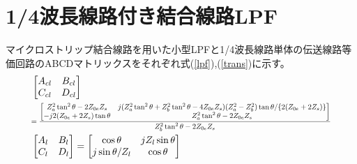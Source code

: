 \documentclass[12pt, fleqn]{jsarticle}
\begin{document}
\section{1/4波長線路付き結合線路LPF}
マイクロストリップ結合線路を用いた小型LPFと1/4波長線路単体の伝送線路等価回路のABCDマトリックスをそれぞれ式(\ref{lpf}),(\ref{trans})に示す。
\begin{align}
  \label{lpf}
  &\begin{bmatrix}
    A_{cl} & B_{cl} \\
    C_{cl} & D_{cl}
  \end{bmatrix} \notag \\
  &\scalebox{0.75}{$
  = \dfrac{
    \begin{bmatrix}
      Z^2_a\tan^2\theta - 2Z_{0e}Z_s &
      j(Z^2_a\tan^2\theta + Z^2_b\tan^2\theta-4Z_{0e}Z_s)(Z^2_a-Z^2_b)\tan\theta/\{2(Z_{0e} + 2Z_s)\} \\
      -j2(Z_{0e}+2Z_s)\tan\theta &
      Z^2_a\tan^2\theta - 2Z_{0e}Z_s
    \end{bmatrix}}
  {Z_b^2\tan^2\theta-2Z_{0e}Z_s} $} \\
  \label{trans}
  &\begin{bmatrix}
    A_l & B_l \\ C_l & D_l
  \end{bmatrix} =
  \begin{bmatrix}
    \cos\theta & jZ_l\sin\theta \\ j\sin\theta/Z_l & \cos\theta
  \end{bmatrix}
\end{align}
\end{document}
